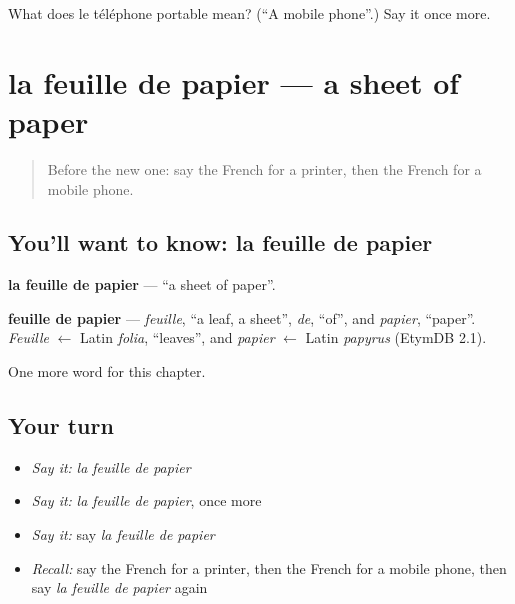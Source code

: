 \begin{tcolorbox}[breakable,colback=teal!4,colframe=teal!35!black,title={Before you move on}]
What does le téléphone portable mean? (\textquotedblleft{}A mobile phone\textquotedblright{}.) Say it once more.
\end{tcolorbox}
\section[la feuille de papier]{la feuille de papier — a sheet of paper}

\label{lesson:FR-C204-feuille-de-papier}



\begin{quote}
Before the new one: say the French for a printer, then the French for a mobile phone.
\end{quote}

\subsection*{You'll want to know: la feuille de papier}
\textbf{la feuille de papier} — \textquotedblleft{}a sheet of paper\textquotedblright{}.

\begin{cousinweb}
\textbf{feuille de papier} — \emph{feuille}, \textquotedblleft{}a leaf, a sheet\textquotedblright{}, \emph{de}, \textquotedblleft{}of\textquotedblright{}, and \emph{papier}, \textquotedblleft{}paper\textquotedblright{}. \emph{Feuille} $\leftarrow$ Latin \emph{folia}, \textquotedblleft{}leaves\textquotedblright{}, and \emph{papier} $\leftarrow$ Latin \emph{papyrus} (EtymDB 2.1).
\end{cousinweb}

\begin{grammarlens}[title={What you've built}]
One more word for this chapter.
\end{grammarlens}

\subsection*{Your turn}
\begin{itemize}
\raggedright
  \item \emph{Say it:} \emph{la feuille de papier}
  \item \emph{Say it:} \emph{la feuille de papier}, once more
  \item \emph{Say it:} say \emph{la feuille de papier}
  \item \emph{Recall:} say the French for a printer, then the French for a mobile phone, then say \emph{la feuille de papier} again
\end{itemize}

